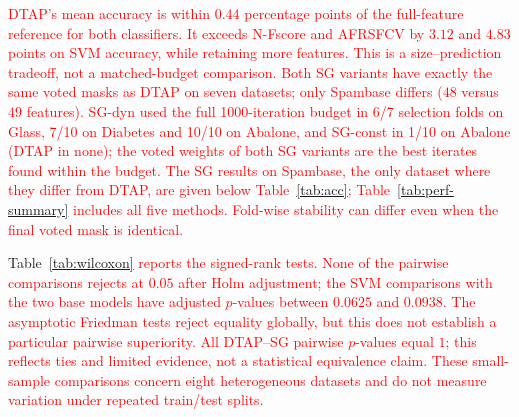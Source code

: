 \documentclass[]{interact}
\theoremstyle{plain}
\theoremstyle{definition}
\theoremstyle{remark}
\begin{document}
\leavevmode\textcolor{red}{DTAP's mean accuracy is within $0.44$ percentage points of the full-feature
reference for both classifiers. It exceeds N-Fscore and AFRSFCV by $3.12$
and $4.83$ points on SVM accuracy, while retaining more features.
This is a size--prediction tradeoff, not a matched-budget comparison.
Both SG variants have exactly the same voted masks as DTAP on seven datasets;
only Spambase differs ($48$ versus $49$ features).
SG-dyn used the full 1000-iteration budget in 6/7 selection folds on Glass,
7/10 on Diabetes and 10/10 on Abalone, and SG-const in 1/10 on Abalone
(DTAP in none); the voted weights of both SG variants are the best iterates
found within the budget. The SG results on Spambase, the only
dataset where they differ from DTAP, are given below Table~\ref{tab:acc};
Table~\ref{tab:perf-summary} includes all five methods.
Fold-wise stability can differ even when the final voted mask is identical.}

Table~\leavevmode\textcolor{red}{\ref{tab:wilcoxon} reports the signed-rank tests. None of the pairwise
comparisons rejects at $0.05$ after Holm adjustment; the SVM comparisons with
the two base models have adjusted $p$-values between $0.0625$ and $0.0938$.
The asymptotic Friedman tests reject equality globally, but this does not establish
a particular pairwise superiority. All DTAP--SG pairwise $p$-values equal $1$;
this reflects ties and limited evidence, not a statistical equivalence claim.
These small-sample comparisons concern eight heterogeneous datasets and do not
measure variation under repeated train/test splits.}
\end{document}
